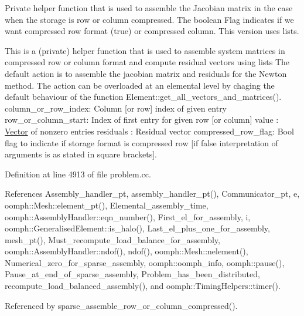 Private helper function that is used to assemble the Jacobian matrix in the case when the storage is row or column compressed. The boolean Flag indicates if we want compressed row format (true) or compressed column. This version uses lists. 

This is a (private) helper function that is used to assemble system matrices in compressed row or column format and compute residual vectors using lists The default action is to assemble the jacobian matrix and residuals for the Newton method. The action can be overloaded at an elemental level by chaging the default behaviour of the function Element\+::get\+\_\+all\+\_\+vectors\+\_\+and\+\_\+matrices(). column\+\_\+or\+\_\+row\+\_\+index\+: Column \mbox{[}or row\mbox{]} index of given entry row\+\_\+or\+\_\+column\+\_\+start\+: Index of first entry for given row \mbox{[}or column\mbox{]} value \+: \hyperlink{classoomph_1_1Vector}{Vector} of nonzero entries residuals \+: Residual vector compressed\+\_\+row\+\_\+flag\+: Bool flag to indicate if storage format is compressed row \mbox{[}if false interpretation of arguments is as stated in square brackets\mbox{]}. 

Definition at line 4913 of file problem.\+cc.



References Assembly\+\_\+handler\+\_\+pt, assembly\+\_\+handler\+\_\+pt(), Communicator\+\_\+pt, e, oomph\+::\+Mesh\+::element\+\_\+pt(), Elemental\+\_\+assembly\+\_\+time, oomph\+::\+Assembly\+Handler\+::eqn\+\_\+number(), First\+\_\+el\+\_\+for\+\_\+assembly, i, oomph\+::\+Generalised\+Element\+::is\+\_\+halo(), Last\+\_\+el\+\_\+plus\+\_\+one\+\_\+for\+\_\+assembly, mesh\+\_\+pt(), Must\+\_\+recompute\+\_\+load\+\_\+balance\+\_\+for\+\_\+assembly, oomph\+::\+Assembly\+Handler\+::ndof(), ndof(), oomph\+::\+Mesh\+::nelement(), Numerical\+\_\+zero\+\_\+for\+\_\+sparse\+\_\+assembly, oomph\+::oomph\+\_\+info, oomph\+::pause(), Pause\+\_\+at\+\_\+end\+\_\+of\+\_\+sparse\+\_\+assembly, Problem\+\_\+has\+\_\+been\+\_\+distributed, recompute\+\_\+load\+\_\+balanced\+\_\+assembly(), and oomph\+::\+Timing\+Helpers\+::timer().



Referenced by sparse\+\_\+assemble\+\_\+row\+\_\+or\+\_\+column\+\_\+compressed().

\mbox{\label{classoomph_1_1Problem_ade9708e503889b48e0a1dbbe47906eba}} 
